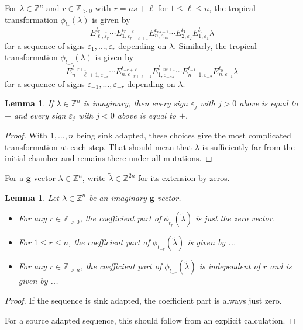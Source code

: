 \documentclass{amsart}
\newtheorem{lemma}[theorem]{Lemma}
\numberwithin{theorem}{section}
\newcommand{\bfg}{\boldsymbol{g}}
\newcommand{\ZZ}{\mathbb{Z}}
\begin{document}
  For $\lambda\in\ZZ^n$ and $r\in\ZZ_{>0}$ with $r=ns+\ell$ for $1\le\ell\le n$, the tropical transformation $\phi_{t_r}(\lambda)$ is given by
  \[E^{t_{r-1}}_{\ell,\varepsilon_r} \cdots E^{t_{r-\ell}}_{1,\varepsilon_{r-\ell+1}} E^{t_{ns-1}}_{n,\varepsilon_{ns}} \cdots E^{t_1}_{2,\varepsilon_2} E^{t_0}_{1,\varepsilon_1} \lambda\]
  for a sequence of signs $\varepsilon_1,\ldots,\varepsilon_r$ depending on $\lambda$.
  Similarly, the tropical transformation $\phi_{t_{-r}}(\lambda)$ is given by
  \[E^{t_{-r+1}}_{n-\ell+1,\varepsilon_{-r}} \cdots E^{t_{-r+\ell}}_{n,\varepsilon_{-r+\ell-1}} E^{t_{-ns+1}}_{1,\varepsilon_{-ns}} \cdots E^{t_{-1}}_{n-1,\varepsilon_{-2}} E^{t_0}_{n,\varepsilon_{-1}} \lambda\]
  for a sequence of signs $\varepsilon_{-1},\ldots,\varepsilon_{-r}$ depending on $\lambda$.
  \begin{lemma}
    If $\lambda\in\ZZ^n$ is imaginary, then every sign $\varepsilon_j$ with $j>0$ above is equal to $-$ and every sign $\varepsilon_j$ with $j<0$ above is equal to $+$.
  \end{lemma}
  \begin{proof}
    With $1,\ldots,n$ being sink adapted, these choices give the most complicated transformation at each step.
    That should mean that $\lambda$ is sufficiently far from the initial chamber and remains there under all mutations.
  \end{proof}

  For a $\bfg$-vector $\lambda\in\ZZ^n$, write $\tilde\lambda\in\ZZ^{2n}$ for its extension by zeros.
  \begin{lemma}
    Let $\lambda\in\ZZ^n$ be an imaginary $\bfg$-vector.
    \begin{itemize}
      \item For any $r\in\ZZ_{>0}$, the coefficient part of $\phi_{t_r}(\tilde\lambda)$ is just the zero vector.
      \item For $1\le r\le n$, the coefficient part of  $\phi_{t_{-r}}(\tilde\lambda)$ is given by ...
      \item For any $r\in\ZZ_{>n}$, the coefficient part of  $\phi_{t_{-r}}(\tilde\lambda)$ is independent of $r$ and is given by ...
    \end{itemize}
  \end{lemma}
  \begin{proof}
    If the sequence is sink adapted, the coefficient part is always just zero.

    For a source adapted sequence, this should follow from an explicit calculation.
  \end{proof}



  
\end{document}
